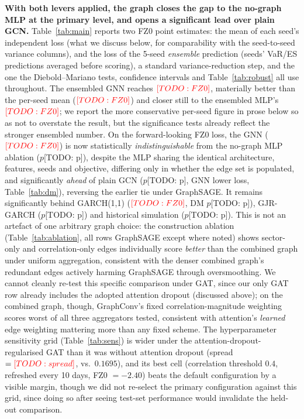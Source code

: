 \documentclass{llncs}
\newcommand{\todo}[1]{{\color{red}[TODO: #1]}}
\newcommand{\gnnFZ}{\todo{FZ0}}
\newcommand{\gnnFZEns}{\todo{FZ0}}
\newcommand{\mlpFZEns}{\todo{FZ0}}
\newcommand{\garchFZ}{\todo{FZ0}}
\newcommand{\dmGarchP}{\todo{p}}
\newcommand{\dmMlpP}{\todo{p}}
\newcommand{\dmGcnP}{\todo{p}}
\newcommand{\dmGjrP}{\todo{p}}
\newcommand{\dmHistsimP}{\todo{p}}
\newcommand{\sensSpread}{\todo{spread}}
\begin{document}
\textbf{With both levers applied, the graph closes the gap to the no-graph MLP
at the primary level, and opens a significant lead over plain GCN.}
Table~\ref{tab:main} reports two FZ0 point estimates: the mean of each seed's
independent loss (what we discuss below, for comparability with the
seed-to-seed variance columns), and the loss of the 5-seed \emph{ensemble}
prediction (seeds' VaR/ES predictions averaged before scoring), a standard
variance-reduction step, and the one the Diebold--Mariano tests, confidence
intervals and Table~\ref{tab:robust} all use throughout. The ensembled GNN
reaches $\gnnFZEns$, materially better than the per-seed mean ($\gnnFZ$) and
closer still to the ensembled MLP's $\mlpFZEns$; we report the more
conservative per-seed figure in prose below so as not to overstate the
result, but the significance tests already reflect the stronger ensembled
number. On the forward-looking FZ0 loss, the GNN ($\gnnFZ$) is now
statistically \emph{indistinguishable} from the no-graph MLP ablation
($p$\dmMlpP), despite the MLP sharing the identical architecture, features,
seeds and objective, differing only in whether the edge set is populated, and
significantly \emph{ahead} of plain GCN ($p$\dmGcnP, GNN lower loss,
Table~\ref{tab:dm}), reversing the earlier tie under GraphSAGE. It remains
significantly behind GARCH(1,1) ($\garchFZ$, DM $p$\dmGarchP), GJR-GARCH
($p$\dmGjrP) and historical simulation ($p$\dmHistsimP). This is not an
artefact of one arbitrary graph choice: the construction ablation
(Table~\ref{tab:ablation}, all rows GraphSAGE except where noted) shows
sector-only and correlation-only edges individually score \emph{better} than
the combined graph under uniform aggregation, consistent with the denser
combined graph's redundant edges actively harming GraphSAGE through
oversmoothing. We cannot cleanly re-test this specific comparison under GAT,
since our only GAT row already includes the adopted attention dropout
(discussed above); on the combined graph, though, GraphConv's fixed
correlation-magnitude weighting scores worst of all three aggregators tested,
consistent with attention's \emph{learned} edge weighting mattering more than
any fixed scheme. The hyperparameter sensitivity
grid (Table~\ref{tab:sens}) is wider under the attention-dropout-regularised
GAT than it was without attention dropout (spread $=\sensSpread$, vs.\
$0.1695$), and its best cell (correlation threshold $0.4$, refreshed every
10 days, FZ0 $=-2.40$) beats the default configuration by a visible margin,
though we did not re-select the primary configuration against this grid,
since doing so after seeing test-set performance would invalidate the
held-out comparison.
\end{document}

